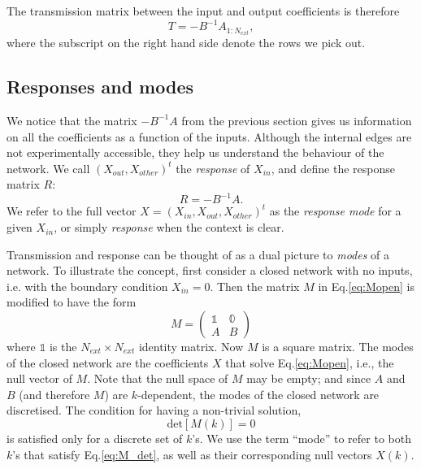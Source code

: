 The transmission matrix between the input and output coefficients is therefore 
\begin{equation}
    \label{eq:T}
    T = -B^{-1}A_{1:N_{ext}},
\end{equation}
where the subscript on the right hand side denote the rows we pick out.

\subsection{Responses and modes}
We notice that the matrix $-B^{-1}A$ from the previous section gives us information on all the coefficients as a function of the inputs. Although the internal edges are not experimentally accessible, they help us understand the behaviour of the network. We call $(X_{out},X_{other})^t$ the \textit{response} of $X_{in}$, and define the response matrix $R$:
\begin{equation}
    \label{eq:R}
    R = -B^{-1}A.
\end{equation}
We refer to the full vector $X=(X_{in},X_{out},X_{other})^t$ as the \textit{response mode} for a given $X_{in}$, or simply \textit{response} when the context is clear.

Transmission and response can be thought of as a dual picture to \textit{modes} of a network. To illustrate the concept, first consider a closed network with no inputs, i.e. with the boundary condition $X_{in}=0$. Then the matrix $M$ in Eq.\ref{eq:Mopen} is modified to have the form 
\begin{equation}
    \label{eq:Mclose}
    M = \begin{pmatrix}\mathbb{1} & \mathbb{0} \\
                        A         & B  \end{pmatrix}
\end{equation}
where $\mathbb{1}$ is the $N_{ext}\times N_{ext}$ identity matrix. Now $M$ is a square matrix. The modes of the closed network are the coefficients $X$ that solve Eq.\ref{eq:Mopen}, i.e., the null vector of $M$. Note that the null space of $M$ may be empty; and since $A$ and $B$ (and therefore $M$) are $k$-dependent, the modes of the closed network are discretised. The condition for having a non-trivial solution,
\begin{equation}
\label{eq:M_det}
    \textrm{det}[M(k)]=0
\end{equation}
is satisfied only for a discrete set of $k$'s. We use the term ``mode'' to refer to both $k$'s that satisfy Eq.\ref{eq:M_det}, as well as their corresponding null vectors $X(k)$.

